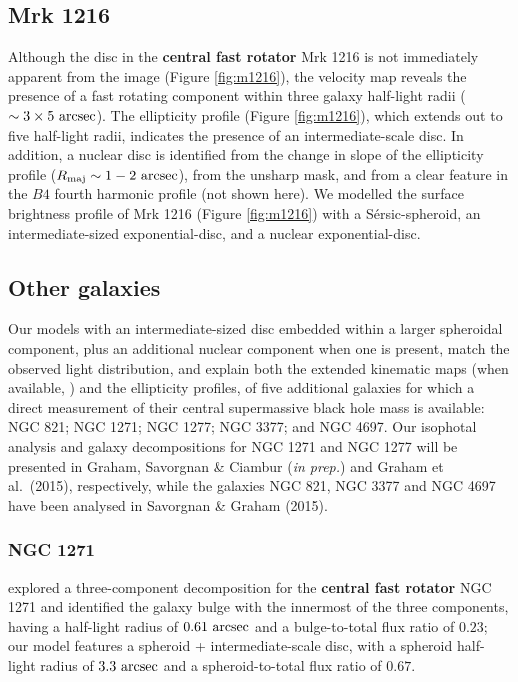 \documentclass[useAMS,usenatbib,article]{mnras}
\begin{document}
\subsection{Mrk 1216}
Although the disc in the {\bf central fast rotator} Mrk 1216 is not immediately apparent from the image (Figure \ref{fig:m1216}), 
the velocity map \citep{yildirim2015} reveals the presence of a fast rotating component 
within three galaxy half-light radii ($\sim 3 \times 5~\rm arcsec$). 
The ellipticity profile (Figure \ref{fig:m1216}), 
which extends out to five half-light radii, indicates the presence of an intermediate-scale disc. 
In addition, a nuclear disc is identified from the change in slope of the ellipticity profile ($R_{\rm maj} \sim 1 - 2 \rm~arcsec$), 
from the unsharp mask, 
and from a clear feature in the $B4$ fourth harmonic profile (not shown here). 
We modelled the surface brightness profile of Mrk 1216 (Figure \ref{fig:m1216}) with a S\'ersic-spheroid, 
an intermediate-sized exponential-disc, and a nuclear exponential-disc. 

\subsection{Other galaxies}
Our models with an intermediate-sized disc embedded within a larger spheroidal component, 
plus an additional nuclear component when one is present, 
match the observed light distribution, and explain both the extended kinematic maps (when available, \citealt{arnold2014}) and the ellipticity profiles, 
of five additional galaxies for which a direct measurement of their central supermassive black hole mass is available: 
NGC 821; NGC 1271; NGC 1277; NGC 3377; and NGC 4697. 
Our isophotal analysis and galaxy decompositions for NGC 1271 and NGC 1277 will be presented in 
Graham, Savorgnan \& Ciambur (\emph{in prep.}) and Graham et al.~(2015), respectively, 
while the galaxies NGC 821, NGC 3377 and NGC 4697 have been analysed in Savorgnan \& Graham (2015). 

\subsubsection{NGC 1271}
\cite{walsh2015} explored a three-component decomposition for the {\bf central fast rotator} NGC 1271 
and identified the galaxy bulge with the innermost of the three components, 
having a half-light radius of $0.61~\rm arcsec$ and a bulge-to-total flux ratio of $0.23$; 
our model features a spheroid + intermediate-scale disc, 
with a spheroid half-light radius of $3.3~\rm arcsec$ and a spheroid-to-total flux ratio of $0.67$. 
\end{document}
